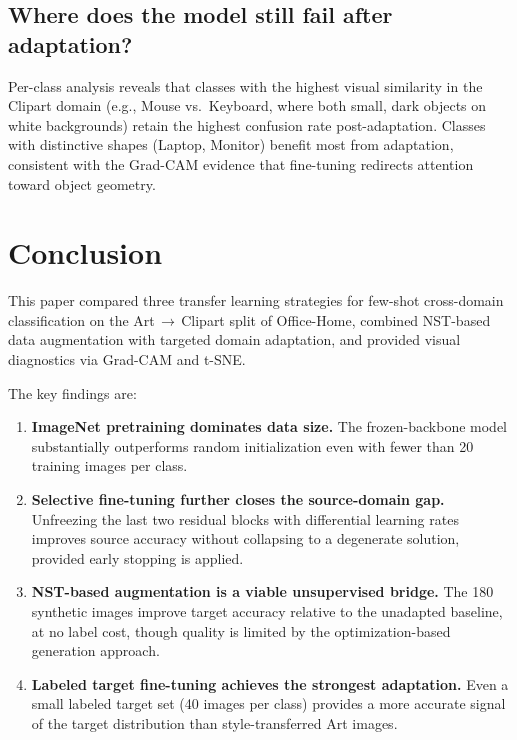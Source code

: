 \documentclass[conference]{IEEEtran}
\begin{document}
\subsection{Where does the model still fail after adaptation?}

Per-class analysis reveals that classes with the highest visual similarity in the
Clipart domain (e.g., Mouse vs.\ Keyboard, where both small, dark objects on white
backgrounds) retain the highest confusion rate post-adaptation.
Classes with distinctive shapes (Laptop, Monitor) benefit most from adaptation,
consistent with the Grad-CAM evidence that fine-tuning redirects attention toward
object geometry.

\section{Conclusion}
\label{sec:conclusion}

This paper compared three transfer learning strategies for few-shot cross-domain
classification on the Art\,$\to$\,Clipart split of Office-Home, combined NST-based
data augmentation with targeted domain adaptation, and provided visual diagnostics
via Grad-CAM and t-SNE.

The key findings are:
\begin{enumerate}
  \item \textbf{ImageNet pretraining dominates data size.}
        The frozen-backbone model substantially outperforms random initialization
        even with fewer than 20 training images per class.
  \item \textbf{Selective fine-tuning further closes the source-domain gap.}
        Unfreezing the last two residual blocks with differential learning rates
        improves source accuracy without collapsing to a degenerate solution, provided
        early stopping is applied.
  \item \textbf{NST-based augmentation is a viable unsupervised bridge.}
        The 180 synthetic images improve target accuracy relative to the unadapted
        baseline, at no label cost, though quality is limited by the optimization-based
        generation approach.
  \item \textbf{Labeled target fine-tuning achieves the strongest adaptation.}
        Even a small labeled target set (40 images per class) provides a more accurate
        signal of the target distribution than style-transferred Art images.
\end{enumerate}
\end{document}
